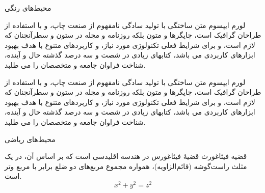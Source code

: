 \documentclass[10pt,ignorenonframetext,]{beamer}
\newenvironment{rmdThink}{
\begin{tcolorbox}[enhanced, title={\textbf{\color{white}بیشتر بدانیم}},colback=MPIGreen!10!white, colframe=MPIGreen,boxrule=0.2mm]}{
\end{tcolorbox}}
\begin{document}
\begin{frame}{محیط‌های رنگی}
\protect\hypertarget{ux645ux62dux6ccux637ux647ux627ux6cc-ux631ux646ux6afux6cc}{}
\begin{rmdThink}
لورم ایپسوم متن ساختگی با تولید سادگی نامفهوم از صنعت چاپ، و با استفاده
از طراحان گرافیک است، چاپگرها و متون بلکه روزنامه و مجله در ستون و
سطرآنچنان که لازم است، و برای شرایط فعلی تکنولوژی مورد نیاز، و کاربردهای
متنوع با هدف بهبود ابزارهای کاربردی می باشد، کتابهای زیادی در شصت و سه
درصد گذشته حال و آینده، شناخت فراوان جامعه و متخصصان را می طلبد.

\end{rmdThink}

\begin{rmdthink}
لورم ایپسوم متن ساختگی با تولید سادگی نامفهوم از صنعت چاپ، و با استفاده
از طراحان گرافیک است، چاپگرها و متون بلکه روزنامه و مجله در ستون و
سطرآنچنان که لازم است، و برای شرایط فعلی تکنولوژی مورد نیاز، و کاربردهای
متنوع با هدف بهبود ابزارهای کاربردی می باشد، کتابهای زیادی در شصت و سه
درصد گذشته حال و آینده، شناخت فراوان جامعه و متخصصان را می طلبد.

\end{rmdthink}
\end{frame}

\begin{frame}{محیط‌های ریاضی}
\protect\hypertarget{ux645ux62dux6ccux637ux647ux627ux6cc-ux631ux6ccux627ux636ux6cc}{}
\begin{Theorem}{قضیه فیثاغورث}
قضیهٔ فیثاغورس در هندسه اقلیدسی است که بر اساس آن، در یک مثلث راست‌گوشه
(قائم‌الزاویه)، همواره مجموع مربع‌های دو ضلع برابر با مربع وتر است.
\[x^2 + y^2 = z^2\]

\end{Theorem}
\end{frame}
\end{document}

